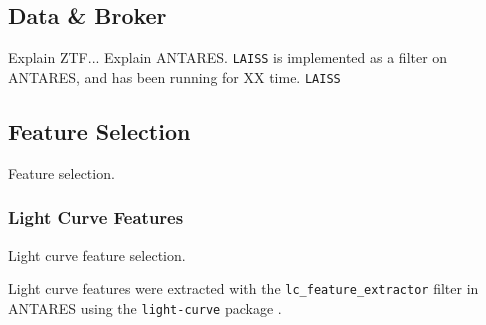 \documentclass[twocolumn]{aastex63}
\newenvironment{rotatepage}%
    {\global\pdfpageattr\expandafter{\the\pdfpageattr/Rotate 90}}%
    {\clearpage\pagebreak[4]\global\pdfpageattr\expandafter{\the\pdfpageattr/Rotate 0}}%
\newcommand{\laiss}{\texttt{LAISS}}
\begin{document}
\pagebreak[4]


\subsection{Data \& Broker} \label{subsec:data_broker}

Explain ZTF...
Explain ANTARES. \laiss{} is implemented as a filter on ANTARES, and has been running for XX time. \laiss

\subsection{Feature Selection} \label{subsec:feature_select}

Feature selection. \par

\subsubsection{Light Curve Features} \label{subsubsec:lc_features}

Light curve feature selection. \par

Light curve features were extracted with the \texttt{lc\_feature\_extractor} filter in ANTARES using the \texttt{light-curve} package \citep{Malanchev-LC}.
\end{document}
